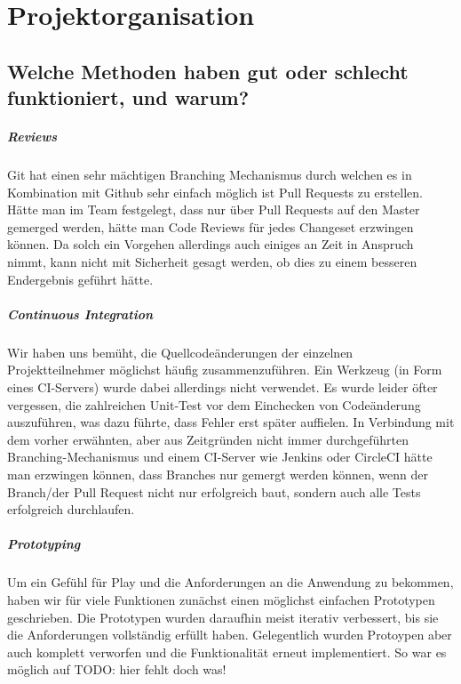 \documentclass[12pt,DIV14,BCOR10mm,a4paper,parskip=half-,headsepline,headinclude,english,ngerman,bibliography=totocnumbered]{scrreprt}
\begin{document}
\vspace*{-3cm}

\tableofcontents  %

\chapter{Projektorganisation}


\section{Welche Methoden haben gut oder schlecht funktioniert, und warum?}

\paragraph{Reviews}
Git hat einen sehr mächtigen Branching Mechanismus durch welchen es in Kombination mit Github sehr einfach möglich ist Pull Requests zu erstellen. Hätte man im Team festgelegt, dass nur über Pull Requests auf den Master gemerged werden, hätte man Code Reviews für jedes Changeset erzwingen können. Da solch ein Vorgehen allerdings auch einiges an Zeit in Anspruch nimmt, kann nicht mit Sicherheit gesagt werden, ob dies zu einem besseren Endergebnis geführt hätte.

\paragraph{Continuous Integration}
Wir haben uns bemüht, die Quellcodeänderungen der einzelnen Projektteilnehmer möglichst häufig zusammenzuführen. Ein Werkzeug (in Form eines CI-Servers) wurde dabei allerdings nicht verwendet. Es wurde leider öfter vergessen, die zahlreichen Unit-Test vor dem Einchecken von Codeänderung auszuführen, was dazu führte, dass Fehler erst später auffielen.
In Verbindung mit dem vorher erwähnten, aber aus Zeitgründen nicht immer durchgeführten Branching-Mechanismus und einem CI-Server wie Jenkins oder CircleCI hätte man erzwingen können, dass Branches nur gemergt werden können, wenn der Branch/der Pull Request nicht nur erfolgreich baut, sondern auch alle Tests erfolgreich durchlaufen.

\paragraph{Prototyping}
Um ein Gefühl für Play und die Anforderungen an die Anwendung zu bekommen, haben wir für viele Funktionen zunächst einen möglichst einfachen Prototypen geschrieben. Die Prototypen wurden daraufhin meist iterativ verbessert, bis sie die Anforderungen vollständig erfüllt haben. Gelegentlich wurden Protoypen aber auch komplett verworfen und die Funktionalität erneut implementiert. So war es möglich auf TODO: hier fehlt doch was!
\end{document}
